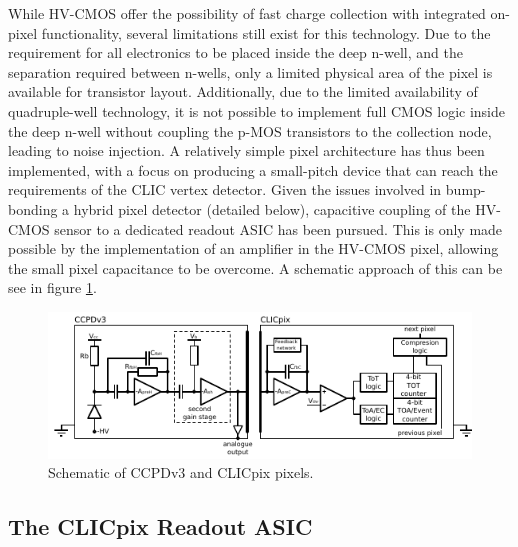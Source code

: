 While HV-CMOS offer the possibility of fast charge collection with integrated on-pixel functionality, several limitations still exist for this technology. Due to the requirement for all electronics to be placed inside the deep n-well, and the separation required between n-wells, only a limited physical area of the pixel is available for transistor layout. Additionally, due to the limited availability of quadruple-well technology, it is not possible to implement full CMOS logic inside the deep n-well without coupling the p-MOS transistors to the collection node, leading to noise injection. A relatively simple pixel architecture has thus been implemented, with a focus on producing a small-pitch device that can reach the requirements of the CLIC vertex detector. Given the issues involved in bump-bonding a hybrid pixel detector (detailed below), capacitive coupling of the HV-CMOS sensor to a dedicated readout ASIC has been pursued. This is only made possible by the implementation of an amplifier in the HV-CMOS pixel, allowing the small pixel capacitance to be overcome. A schematic approach of this can be see in figure \ref{fig:ccpdandclicpix}.
 
\begin{figure}
\centering
\includegraphics[width=1.0\textwidth]{CLICdpVertex/Plots/schematic.pdf}
\caption[Schematic of CCPDv3 and CLICpix pixels.]{Schematic of CCPDv3 and CLICpix pixels.}
\label{fig:ccpdandclicpix}
\end{figure}


\subsection{The CLICpix Readout ASIC}

